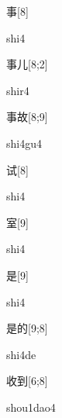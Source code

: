 \begin{verbete}[shi4]{事}[8]
\begin{pronuncia}{shi4}
\end{pronuncia}
\end{verbete}

\begin{verbete}[shir4]{事儿}[8;2]
\begin{pronuncia}{shir4}
\end{pronuncia}
\end{verbete}

\begin{verbete}[shi4gu4]{事故}[8;9]
\begin{pronuncia}{shi4gu4}
\end{pronuncia}
\end{verbete}

\begin{verbete}[shi4]{试}[8]
\begin{pronuncia}{shi4}
\end{pronuncia}
\end{verbete}

\begin{verbete}[shi4]{室}[9]
\begin{pronuncia}{shi4}
\end{pronuncia}
\end{verbete}

\begin{verbete}[shi4]{是}[9]
\begin{pronuncia}{shi4}
\end{pronuncia}
\end{verbete}

\begin{verbete}[shi4de]{是的}[9;8]
\begin{pronuncia}{shi4de}
\end{pronuncia}
\end{verbete}

\begin{verbete}{收到}[6;8]
\begin{pronuncia}{shou1dao4}
\end{pronuncia}
\end{verbete}

